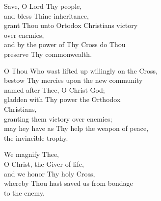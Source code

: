 \documentclass{article}
\begin{document}
%
%
Save, O Lord Thy people,\\
and bless Thine inheritance,\\
grant Thou unto Ortodox Christians victory \\
   \cont over enemies,\\
and by the power of Thy Cross do Thou \\
   \cont preserve Thy commonwealth.


%
O Thou Who wast lifted up willingly on the Cross, \\
bestow Thy mercies upon the new community \\
  \cont named after Thee, O Christ God; \\
gladden with Thy power the Orthodox \\
  \cont Christians,\\
granting them victory over enemies;\\
may hey have as Thy help the weapon of peace, \\
  \cont the invincible trophy.

%
We magnify Thee, \\
O Christ, the Giver of life, \\
and we honor Thy holy Cross, \\
whereby Thou hast saved us from bondage \\
  \cont to the enemy.
\end{document}
